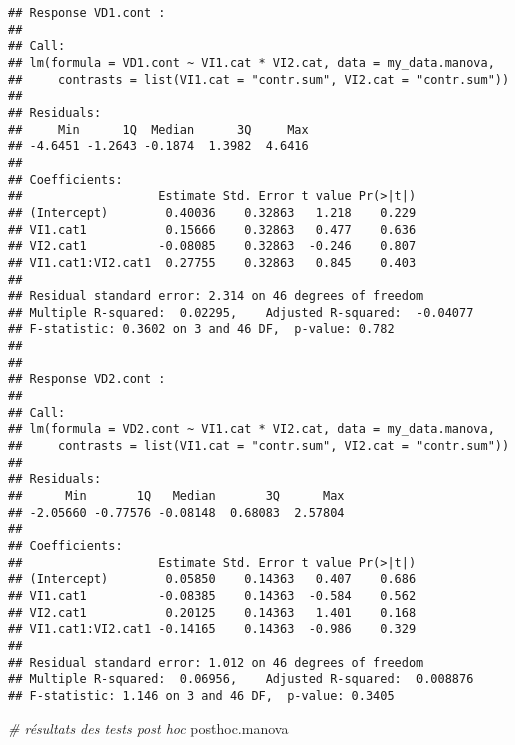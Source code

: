 \documentclass[
]{book}
\newenvironment{Shaded}{\begin{snugshade}}{\end{snugshade}}
\newcommand{\CommentTok}[1]{\textcolor[rgb]{0.56,0.35,0.01}{\textit{#1}}}
\newcommand{\NormalTok}[1]{#1}
\begin{document}
\begin{verbatim}
## Response VD1.cont :
## 
## Call:
## lm(formula = VD1.cont ~ VI1.cat * VI2.cat, data = my_data.manova, 
##     contrasts = list(VI1.cat = "contr.sum", VI2.cat = "contr.sum"))
## 
## Residuals:
##     Min      1Q  Median      3Q     Max 
## -4.6451 -1.2643 -0.1874  1.3982  4.6416 
## 
## Coefficients:
##                   Estimate Std. Error t value Pr(>|t|)
## (Intercept)        0.40036    0.32863   1.218    0.229
## VI1.cat1           0.15666    0.32863   0.477    0.636
## VI2.cat1          -0.08085    0.32863  -0.246    0.807
## VI1.cat1:VI2.cat1  0.27755    0.32863   0.845    0.403
## 
## Residual standard error: 2.314 on 46 degrees of freedom
## Multiple R-squared:  0.02295,	Adjusted R-squared:  -0.04077 
## F-statistic: 0.3602 on 3 and 46 DF,  p-value: 0.782
## 
## 
## Response VD2.cont :
## 
## Call:
## lm(formula = VD2.cont ~ VI1.cat * VI2.cat, data = my_data.manova, 
##     contrasts = list(VI1.cat = "contr.sum", VI2.cat = "contr.sum"))
## 
## Residuals:
##      Min       1Q   Median       3Q      Max 
## -2.05660 -0.77576 -0.08148  0.68083  2.57804 
## 
## Coefficients:
##                   Estimate Std. Error t value Pr(>|t|)
## (Intercept)        0.05850    0.14363   0.407    0.686
## VI1.cat1          -0.08385    0.14363  -0.584    0.562
## VI2.cat1           0.20125    0.14363   1.401    0.168
## VI1.cat1:VI2.cat1 -0.14165    0.14363  -0.986    0.329
## 
## Residual standard error: 1.012 on 46 degrees of freedom
## Multiple R-squared:  0.06956,	Adjusted R-squared:  0.008876 
## F-statistic: 1.146 on 3 and 46 DF,  p-value: 0.3405
\end{verbatim}

\begin{Shaded}
\begin{Highlighting}[]
\CommentTok{# résultats des tests post hoc}
\NormalTok{posthoc.manova}
\end{Highlighting}
\end{Shaded}
\end{document}
